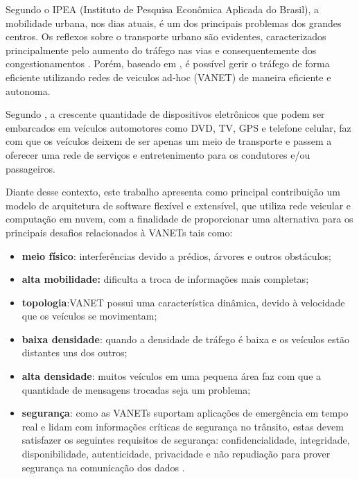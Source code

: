 \documentclass[
	12pt,				%
	oneside,			%
	a4paper,			%
	english,			%
	brazil				%
	]{abntex2ppgsi}
\begin{document}
Segundo o IPEA (Instituto de Pesquisa Econômica Aplicada do Brasil), a mobilidade urbana, nos dias atuais, é um dos principais problemas dos grandes centros. Os reflexos sobre o transporte urbano são evidentes, caracterizados principalmente pelo aumento do tráfego nas vias e consequentemente dos congestionamentos \cite{carvalho2010mobilidade}. Porém, baseado em  , é possível gerir o tráfego de forma eficiente utilizando redes de veiculos ad-hoc (VANET) de maneira eficiente e autonoma.

Segundo  , a crescente quantidade de dispositivos eletrônicos que podem ser embarcados em veículos automotores como DVD, TV, GPS e telefone celular, faz com que os veículos deixem de ser apenas um meio de transporte e passem a oferecer uma rede de serviços e entretenimento para os condutores e/ou passageiros.

Diante desse contexto, este trabalho apresenta como principal contribuição um modelo de arquitetura de software flexível e extensível, que utiliza rede veicular  e  computação em nuvem, com a finalidade de proporcionar uma alternativa para os principais desafios relacionados à VANETs tais como: 

\begin{itemize}
	\item{\textbf{meio físico}: interferências devido a prédios,  árvores e outros obstáculos;}
	\item{\textbf{alta mobilidade:} dificulta a troca de informações mais completas; }
	\item{\textbf{topologia}:VANET possui uma característica dinâmica, devido à velocidade que os veículos se movimentam;}	
	\item{\textbf{baixa densidade}: quando a densidade de tráfego é baixa e os veículos estão distantes uns dos outros;}
	\item{\textbf{alta densidade}: muitos veículos em uma pequena área faz com que a quantidade de mensagens trocadas seja um problema;}
	\item{\textbf{segurança}: como as VANETs suportam aplicações de emergência em tempo real e lidam com informações	críticas de segurança no trânsito, estas devem satisfazer os seguintes requisitos de segurança: confidencialidade, integridade, disponibilidade, autenticidade, privacidade e não repudiação para prover segurança na comunicação dos dados \cite{samara2010security} \cite{matos2013analise}.}
\end{itemize} 
\end{document}
